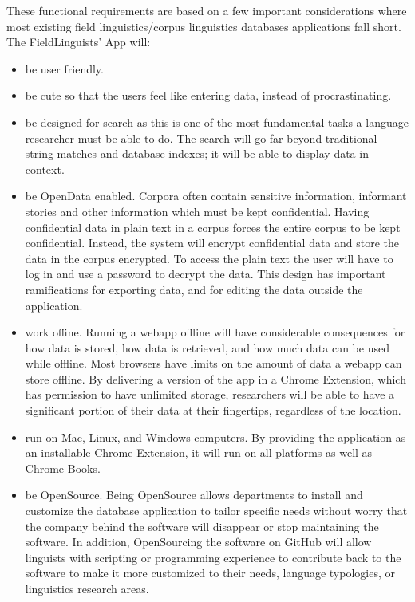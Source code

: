 \documentclass[12 pt]{article}
\begin{document}
These functional requirements are based on a few important considerations where most existing field linguistics/corpus linguistics databases applications fall short. The FieldLinguists' App will:

\begin{itemize}

\item be user friendly.
\item be cute so that the users feel like entering data, instead of procrastinating.
\item be designed for search as this is one of the most fundamental tasks a language researcher must be able to do. The search will go far beyond traditional string matches and database indexes; it will be able to display data in context.
\item be OpenData enabled. Corpora often contain sensitive information, informant stories and other information which must be kept confidential. Having confidential data in plain text in a corpus forces the entire corpus to be kept confidential. Instead, the system will encrypt confidential data and store the data in the corpus encrypted. To access the plain text the user will have to log in and use a password to decrypt the data. This design has important ramifications for exporting data, and for editing the data outside the application.
\item work offine. Running a webapp offline will have considerable consequences for how data is stored, how data is retrieved, and how much data can be used while offline. Most browsers have limits on the amount of data a webapp can store offline. By delivering a version of the app in a Chrome Extension, which has permission to have unlimited storage, researchers will be able to have a significant portion of their data at their fingertips, regardless of the location. 
\item run on Mac, Linux, and Windows computers. By providing the application as an installable Chrome Extension, it will run on all platforms as well as Chrome Books.
\item be OpenSource. Being OpenSource allows departments to install and customize the database application to tailor specific needs without worry that the company behind the software will disappear or stop maintaining the software. In addition, OpenSourcing the software on GitHub will allow linguists with scripting or programming experience to contribute back to the software to make it more customized to their needs, language typologies, or linguistics research areas.

\end{itemize}
\end{document}
